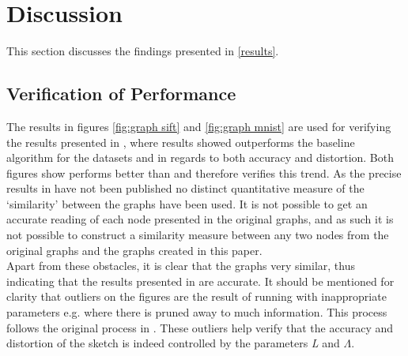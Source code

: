 \section{Discussion}
\label{discussion}
This section discusses the findings presented in \ref{results}.

\subsection{Verification of Performance}
The results in figures \ref{fig:graph sift} and \ref{fig:graph mnist} are used for verifying the results presented in \cite{wagner17}, where results showed \qs{} outperforms the baseline algorithm \grid{} for the datasets \sift{} and \mnist{} in regards to both accuracy and distortion. Both figures show \qs{} performs better than \grid{} and therefore verifies this trend. As the precise results in \cite{wagner17} have not been published no distinct quantitative measure of the ‘similarity’ between the graphs have been used. It is not possible to get an accurate reading of each node presented in the original graphs, and as such it is not possible to construct a similarity measure between any two nodes from the original graphs and the graphs created in this paper. 
\\
Apart from these obstacles, it is clear that the graphs very similar, thus indicating that the results presented in \cite{wagner17} are accurate. It should be mentioned for clarity that outliers on the figures are the result of running \qs{} with inappropriate parameters e.g. where there is pruned away to much information. This process follows the original process in \cite{wagner17}. These outliers help verify that the accuracy and distortion of the sketch is indeed controlled by the parameters \textit{L} and $\Lambda$.  

